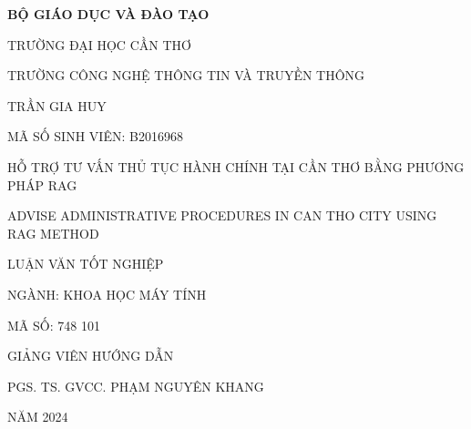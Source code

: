 \begin{center}
    \bf BỘ GIÁO DỤC VÀ ĐÀO TẠO

    TRƯỜNG ĐẠI HỌC CẦN THƠ

    TRƯỜNG CÔNG NGHỆ THÔNG TIN VÀ TRUYỀN THÔNG

    \vspace{2cm}

    TRẦN GIA HUY

    MÃ SỐ SINH VIÊN: B2016968

    \vspace{2cm}

    {\large
        HỖ TRỢ TƯ VẤN THỦ TỤC HÀNH CHÍNH TẠI CẦN THƠ BẰNG PHƯƠNG PHÁP RAG

        \vspace{1cm}
        ADVISE ADMINISTRATIVE PROCEDURES IN CAN THO CITY USING RAG METHOD
    }

    \vspace{2cm}

    LUẬN VĂN TỐT NGHIỆP

    NGÀNH: KHOA HỌC MÁY TÍNH

    MÃ SỐ: 748 101

    \vspace{2cm}

    GIẢNG VIÊN HƯỚNG DẪN

    PGS. TS. GVCC. PHẠM NGUYÊN KHANG

    \vspace{4cm}

    NĂM 2024
\end{center}